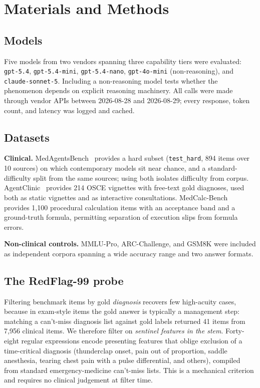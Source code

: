\documentclass[journal,twoside]{IEEEtran}
\begin{document}
\section{Materials and Methods}

\subsection{Models}
Five models from two vendors spanning three capability tiers were evaluated:
\texttt{gpt-5.4}, \texttt{gpt-5.4-mini}, \texttt{gpt-5.4-nano}, \texttt{gpt-4o-mini} (non-reasoning),
and \texttt{claude-sonnet-5}. Including a non-reasoning model tests whether the phenomenon depends on
explicit reasoning machinery. All calls were made through vendor APIs between 2026-08-28 and
2026-08-29; every response, token count, and latency was logged and cached.

\subsection{Datasets}
\textbf{Clinical.} MedAgentsBench~\cite{medagents} provides a hard subset (\texttt{test\_hard},
894 items over 10 sources) on which contemporary models sit near chance, and a standard-difficulty
split from the same sources; using both isolates difficulty from corpus. AgentClinic~\cite{agentclinic}
provides 214 OSCE vignettes with free-text gold diagnoses, used both as static vignettes and as
interactive consultations. MedCalc-Bench~\cite{medcalc} provides 1{,}100 procedural calculation items
with an acceptance band and a ground-truth formula, permitting separation of execution slips from
formula errors.

\textbf{Non-clinical controls.} MMLU-Pro, ARC-Challenge, and GSM8K were included as independent
corpora spanning a wide accuracy range and two answer formats.

\subsection{The RedFlag-99 probe}
Filtering benchmark items by gold \emph{diagnosis} recovers few high-acuity cases, because in
exam-style items the gold answer is typically a management step: matching a can't-miss diagnosis list
against gold labels returned 41 items from 7{,}956 clinical items. We therefore filter on
\emph{sentinel features in the stem}. Forty-eight regular expressions encode presenting features that
oblige exclusion of a time-critical diagnosis (thunderclap onset, pain out of proportion, saddle
anesthesia, tearing chest pain with a pulse differential, and others), compiled from standard
emergency-medicine can't-miss lists. This is a mechanical criterion and requires no clinical
judgement at filter time.
\end{document}

